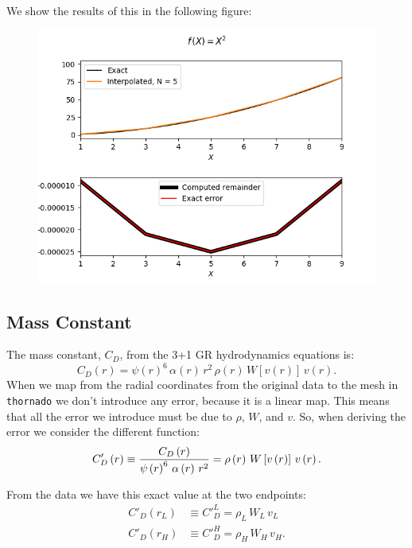 \documentclass[10pt,preprint]{aastex}
\begin{document}
We show the results of this in the following figure:
\begin{figure}[H]
\centering
\includegraphics[scale=0.75]{LinearInterpolationError}
\end{figure}

\subsection{Mass Constant}
The mass constant, $C_{D}$, from the 3+1 GR hydrodynamics equations is:
\begin{equation}
    C_{D}\left(r\right)=\psi\left(r\right)^{6}\,\alpha\left(r\right)\,r^{2}\,\rho\left(r\right)\,W\left[v\left(r\right)\right]\,v\left(r\right).
\end{equation}
When we map from the radial coordinates from the original data to the mesh in \texttt{thornado} we don't introduce any error, because it is a linear map. This means that all the error we introduce must be due to $\rho$, $W$, and $v$. So, when deriving the error we consider the different function:
\begin{equation}
    C'_{D}\left(r\right)\equiv\frac{C_{D}\left(r\right)}{\psi\left(r\right)^{6}\,\alpha\left(r\right)\,r^{2}}=\rho\left(r\right)\,W\left[v\left(r\right)\right]\,v\left(r\right).
\end{equation}

From the data we have this exact value at the two endpoints:
\begin{align}
    C'_{D}\left(r_{L}\right)&\equiv C'^{L}_{D}=\rho_{L}\,W_{L}\,v_{L}\\
    C'_{D}\left(r_{H}\right)&\equiv C'^{H}_{D}=\rho_{H}\,W_{H}\,v_{H}.
\end{align}


\newpage







\end{document}
